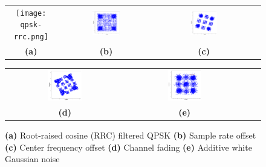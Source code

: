 \documentclass{article}
\begin{document}
\begin{figure} [H]
    \centering
    \begin{tabular}{cccc}
    \texttt{[image: qpsk-rrc.png]} &
    \label{fig:qpsk rrc}
    \includegraphics[width=0.3\textwidth]{sro.png} &
    \includegraphics[width=0.3\textwidth]{cfo.png} \\
    \textbf{(a)}  & \textbf{(b)} & \textbf{(c)}  \\[6pt]
    \end{tabular}
    \begin{tabular}{cccc}
    \includegraphics[width=0.3\textwidth]{fading.png} &
    \includegraphics[width=0.3\textwidth]{awgn.png} \\
    \textbf{(d)}  & \textbf{(e)}  \\[6pt]
    \end{tabular}
    \caption{ \textbf{(a)} Root-raised cosine (RRC) filtered QPSK
    \textbf{(b)} Sample rate offset
    \textbf{(c)} Center frequency offset
    \textbf{(d)} Channel fading
    \textbf{(e)} Additive white Gaussian noise}
    \label{fig:channel model}
    \end{figure}
\end{document}
